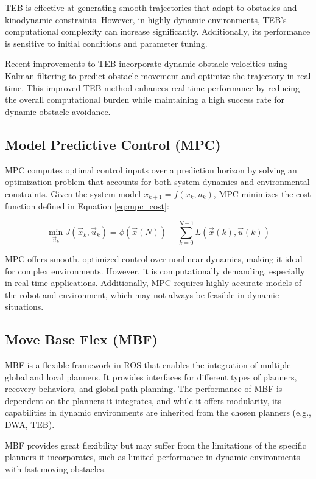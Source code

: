 \documentclass[conference]{IEEEtran}
\begin{document}
TEB is effective at generating smooth trajectories that adapt to obstacles and kinodynamic constraints. However, in highly dynamic environments, TEB's computational complexity can increase significantly. Additionally, its performance is sensitive to initial conditions and parameter tuning.

Recent improvements to TEB incorporate dynamic obstacle velocities using Kalman filtering to predict obstacle movement and optimize the trajectory in real time. This improved TEB method \cite{chen2021dynamic} enhances real-time performance by reducing the overall computational burden while maintaining a high success rate for dynamic obstacle avoidance.

\subsection{Model Predictive Control (MPC)}
MPC computes optimal control inputs over a prediction horizon by solving an optimization problem that accounts for both system dynamics and environmental constraints. Given the system model \(x_{k+1} = f(x_k, u_k)\), MPC minimizes the cost function defined in Equation \eqref{eq:mpc_cost}:

\begin{equation}
\min_{\vec{u}_k} J(\vec{x}_k, \vec{u}_k) = \phi(\vec{x}(N)) + \sum_{k=0}^{N-1} L(\vec{x}(k), \vec{u}(k))
\end{equation}

MPC offers smooth, optimized control over nonlinear dynamics, making it ideal for complex environments. However, it is computationally demanding, especially in real-time applications. Additionally, MPC requires highly accurate models of the robot and environment, which may not always be feasible in dynamic situations.

\subsection{Move Base Flex (MBF)}
MBF is a flexible framework in ROS that enables the integration of multiple global and local planners. It provides interfaces for different types of planners, recovery behaviors, and global path planning. The performance of MBF is dependent on the planners it integrates, and while it offers modularity, its capabilities in dynamic environments are inherited from the chosen planners (e.g., DWA, TEB).

MBF provides great flexibility but may suffer from the limitations of the specific planners it incorporates, such as limited performance in dynamic environments with fast-moving obstacles.
\end{document}
